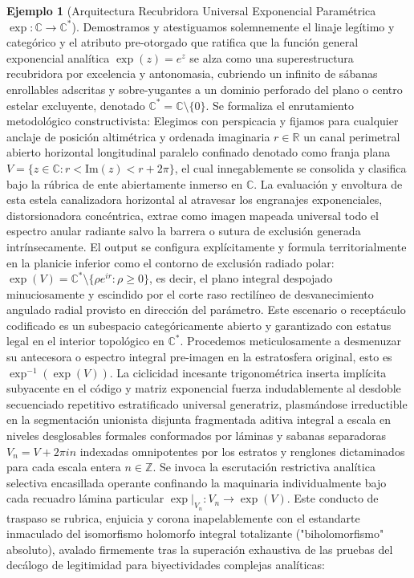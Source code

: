 \documentclass[11pt,a4paper]{article}
\theoremstyle{definition}
\newtheorem{ejemplo}{Ejemplo}[section]
\theoremstyle{remark}
\numberwithin{equation}{section}
\begin{document}
\begin{ejemplo}[Arquitectura Recubridora Universal Exponencial Paramétrica $\exp: \mathbb{C} \to \mathbb{C}^*$]
Demostramos y atestiguamos solemnemente el linaje legítimo y categórico y el atributo pre-otorgado que ratifica que la función general exponencial analítica $\exp(z) = e^z$ se alza como una superestructura recubridora por excelencia y antonomasia, cubriendo un infinito de sábanas enrollables adscritas y sobre-yugantes a un dominio perforado del plano o centro estelar excluyente, denotado $\mathbb{C}^* = \mathbb{C} \setminus \{0\}$.
Se formaliza el enrutamiento metodológico constructivista: Elegimos con perspicacia y fijamos para cualquier anclaje de posición altimétrica y ordenada imaginaria $r \in \mathbb{R}$ un canal perimetral abierto horizontal longitudinal paralelo confinado denotado como franja plana $V = \{ z \in \mathbb{C} : r < \text{Im}(z) < r + 2\pi \}$, el cual innegablemente se consolida y clasifica bajo la rúbrica de ente abiertamente inmerso en $\mathbb{C}$. 
La evaluación y envoltura de esta estela canalizadora horizontal al atravesar los engranajes exponenciales, distorsionadora concéntrica, extrae como imagen mapeada universal todo el espectro anular radiante salvo la barrera o sutura de exclusión generada intrínsecamente. El output se configura explícitamente y formula territorialmente en la planicie inferior como el contorno de exclusión radiado polar: $\exp(V) = \mathbb{C}^* \setminus \{ \rho e^{ir} : \rho \geq 0 \}$, es decir, el plano integral despojado minuciosamente y escindido por el corte raso rectilíneo de desvanecimiento angulado radial provisto en dirección del parámetro. Este escenario o receptáculo codificado es un subespacio categóricamente abierto y garantizado con estatus legal en el interior topológico en $\mathbb{C}^*$.
Procedemos meticulosamente a desmenuzar su antecesora o espectro integral pre-imagen en la estratosfera original, esto es $\exp^{-1}(\exp(V))$. La ciclicidad incesante trigonométrica inserta implícita subyacente en el código y matriz exponencial fuerza indudablemente al desdoble secuenciado repetitivo estratificado universal generatriz, plasmándose irreductible en la segmentación unionista disjunta fragmentada aditiva integral a escala en niveles desglosables formales conformados por láminas y sabanas separadoras $V_n = V + 2\pi i n$ indexadas omnipotentes por los estratos y renglones dictaminados para cada escala entera $n \in \mathbb{Z}$.
Se invoca la escrutación restrictiva analítica selectiva encasillada operante confinando la maquinaria individualmente bajo cada recuadro lámina particular $\exp|_{V_n} : V_n \to \exp(V)$. Este conducto de traspaso se rubrica, enjuicia y corona inapelablemente con el estandarte inmaculado del isomorfismo holomorfo integral totalizante ("biholomorfismo" absoluto), avalado firmemente tras la superación exhaustiva de las pruebas del decálogo de legitimidad para biyectividades complejas analíticas: 

\end{ejemplo}
\end{document}
